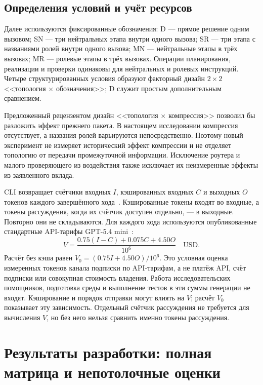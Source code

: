 \subsection{Определения условий и учёт ресурсов}

Далее используются фиксированные обозначения: D --- прямое решение одним вызовом; SN --- три нейтральных этапа внутри одного вызова; SR --- три этапа с названиями ролей внутри одного вызова; MN --- нейтральные этапы в трёх вызовах; MR --- ролевые этапы в трёх вызовах. Операции планирования, реализации и проверки одинаковы для нейтральных и ролевых инструкций. Четыре структурированных условия образуют факторный дизайн $2\times2$ <<топология $\times$ обозначения>>; D служит простым дополнительным сравнением.

Предложенный рецензентом дизайн <<топология $\times$ компрессия>> позволил бы разложить эффект прежнего пакета. В настоящем исследовании компрессия отсутствует, а названия ролей варьируются непосредственно. Поэтому новый эксперимент не измеряет исторический эффект компрессии и не отделяет топологию от передачи промежуточной информации. Исключение роутера и малого проверяющего из воздействия также исключает их неизмеренные эффекты из заявленного вклада.

CLI возвращает счётчики входных $I$, кэшированных входных $C$ и выходных $O$ токенов каждого завершённого хода~\cite{codexexec2026}. Кэшированные токены входят во входные, а токены рассуждения, когда их счётчик доступен отдельно, --- в выходные. Повторно они не складываются. Для каждого хода используются опубликованные стандартные API-тарифы GPT-5.4 mini~\cite{openai54mini2026,openaipricing2026}:
\begin{equation}
V=\frac{0.75(I-C)+0.075C+4.50O}{10^6}\quad\mathrm{USD}.
\end{equation}
Расчёт без кэша равен $V_0=(0.75I+4.50O)/10^6$. Это условная оценка измеренных токенов канала подписки по API-тарифам, а не платёж API, счёт подписки или совокупная стоимость владения. Работа исследовательских помощников, подготовка среды и выполнение тестов в эти суммы генерации не входят. Кэширование и порядок отправки могут влиять на $V$; расчёт $V_0$ показывает эту зависимость. Отдельный счётчик рассуждения не требуется для вычисления $V$, но без него нельзя сравнить именно токены рассуждения.

\section{Результаты разработки: полная матрица и непотолочные оценки}
\label{sec:dev40-results}

